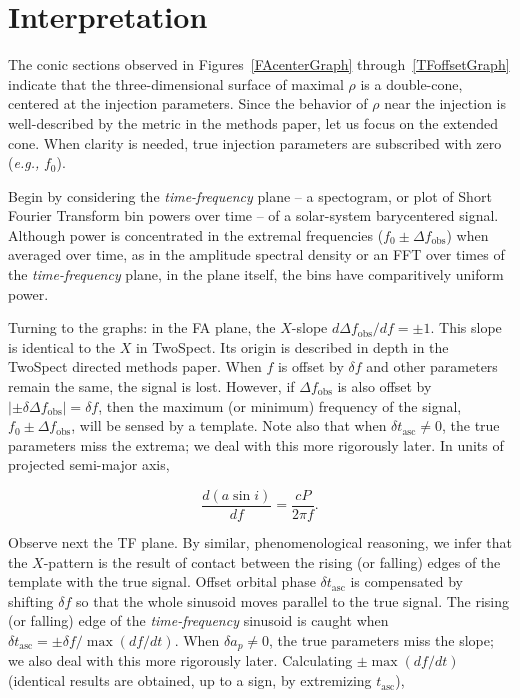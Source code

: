 \documentclass{article}
\begin{document}
\section{Interpretation}

The conic sections observed in Figures~\ref{FAcenterGraph} through~\ref{TFoffsetGraph} indicate that the three-dimensional surface of maximal $\rho$ is a double-cone, centered at the injection parameters.
Since the behavior of $\rho$ near the injection is well-described by the metric in the methods paper, let us focus on the extended cone.
When clarity is needed, true injection parameters are subscribed with zero (\textit{e.g.,} $f_0$).

Begin by considering the \textit{time-frequency} plane -- a spectogram, or plot of Short Fourier Transform bin powers over time -- of a solar-system barycentered signal.
Although power is concentrated in the extremal frequencies ($f_0 \pm \Delta f_\mathrm{obs}$) when averaged over time, as in the amplitude spectral density or an FFT over times of the \textit{time-frequency} plane, in the plane itself, the bins have comparitively uniform power.

Turning to the graphs: in the FA plane, the $X$-slope $d \Delta f_\mathrm{obs} / df = \pm1$.
This slope is identical to the $X$ in TwoSpect.
Its origin is described in depth in the TwoSpect directed methods paper.
When $f$ is offset by $\delta f$ and other parameters remain the same, the signal is lost.
However, if $\Delta f_\mathrm{obs}$ is also offset by $|\pm \delta \Delta f_\mathrm{obs}| = \delta f$, then the maximum (or minimum) frequency of the signal, $f_0 \pm \Delta f_\mathrm{obs}$, will be sensed by a template. 
Note also that when $\delta t_\mathrm{asc} \neq 0$, the true parameters miss the extrema; we deal with this more rigorously later.
In units of projected semi-major axis,

\begin{equation}
\frac{d (a \sin i)}{d f} = \frac{c P}{2 \pi f}.
\end{equation}

Observe next the TF plane.
By similar, phenomenological reasoning, we infer that the $X$-pattern is the result of contact between the rising (or falling) edges of the template with the true signal. 
Offset orbital phase $\delta t_\mathrm{asc}$ is compensated by shifting $\delta f$ so that the whole sinusoid moves parallel to the true signal.
The rising (or falling) edge of the \textit{time-frequency} sinusoid is caught when $\delta t_\mathrm{asc} = \pm \delta f / \max(df /dt)$.
When $\delta a_p \neq 0$, the true parameters miss the slope; we also deal with this more rigorously later.
Calculating $\pm \max \left(d f / d t\right)$ (identical results are obtained, up to a sign, by extremizing $t_\mathrm{asc}$),
\end{document}
